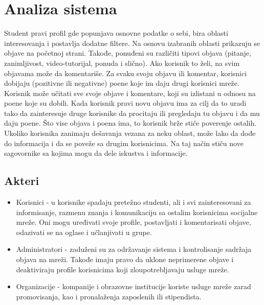 \section{Analiza sistema}

Student pravi profil gde popunjava osnovne podatke o sebi, bira oblasti interesovanja i postavlja dodatne filtere. Na osnovu izabranih oblasti prikazuju se objave na početnoj strani. Takođe, ponuđeni
su različiti tipovi objava (pitanje, zanimljivost, video-tutorijal, ponuda i slično).
Ako korisnik to želi, na svim objavama može da komentariše.
Za svaku svoju objavu ili komentar, korisnici dobijaju (pozitivne ili negativne) poene koje im daju drugi korisnici mreže. Korisnik može
učitati sve svoje objave i komentare, koji su izlistani u odnosu na poene koje
su dobili. Kada korisnik pravi novu objavu ima za cilj da to uradi tako da
zainteresuje druge korisnike da procitaju ili pregledaju tu objavu i da mu
daju poene. Što vise objava i poena ima, to korisnik brže stiče poverenje
ostalih.
Ukoliko korisnika zanimaju dešavanja vezana za neku oblast, može lako da dođe do informacija i da se poveže sa drugim korisnicima. Na taj način stiču nove sagovornike sa kojima mogu da dele iskustva i informacije.

\subsection{Akteri}
\begin{itemize}
    \item Korisnici - u korisnike spadaju pretežno studenti, ali i svi zainteresovani za informisanje, razmenu znanja i komunikaciju sa ostalim korisnicima socijalne mreže. Oni mogu uređivati svoje profile, postavljati i komentarisati objave, odazivati se na oglase i učlanjivati u grupe.
    \item Administratori - zaduženi su za održavanje sistema i kontrolisanje sadržaja objava na mreži. Takođe imaju pravo da uklone neprimerene objave i deaktiviraju profile korisnicima koji zloupotrebljavaju usluge mreže.
    \item Organizacije - kompanije i obrazovne institucije koriste usluge mreže zarad promovisanja, kao i  pronalaženja zaposlenih ili stipendista.
\end{itemize}

